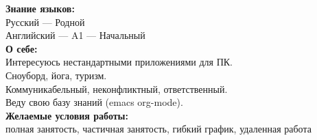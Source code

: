 \documentclass[14pt]{extreport}
\begin{document}
\textbf{Знание языков:} \\
Русский --- Родной \\
Английский --- A1 --- Начальный \\

\textbf{О себе:} \\
Интересуюсь нестандартными приложениями для ПК. \\ 
Сноуборд, йога, туризм. \\
Коммуникабельный, неконфликтный, ответственный. \\
Веду свою базу знаний (emacs org-mode). \\

\textbf{Желаемые условия работы:}\\ 
\hspace{27pt}полная занятость, частичная занятость, гибкий график, удаленная работа \\
\end{document}
